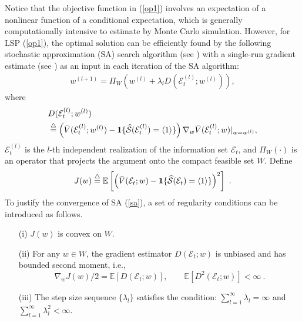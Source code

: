 \documentclass[journal]{IEEEtran}
\newcommand{\ed}{\stackrel{\triangle}{=}}
\begin{document}
      Notice that the objective function in (\ref{op1}) involves an expectation of a nonlinear function of a conditional expectation, which is generally computationally intensive to estimate by Monte Carlo simulation. However, for LSP (\ref{op1}), the optimal solution can be efficiently found by the following stochastic approximation (SA) search algorithm (see \cite{yin2003stochastic}) with a single-run gradient estimate (see \cite{fu2015gradient}) as an input in each iteration of the SA algorithm: 
     \begin{align}\label{sa}w^{(l+1)}=\Pi_{W}\left( w^{(l)}+\lambda_l D(\mathcal{E}_t^{(l)};w^{(l)})\right) ,\end{align}
       where 
       \begin{align*}
       &D(\mathcal{E}_t^{(l)};w^{(l)})\\
       &\ed\left(\bar{V}(\mathcal{E}_t^{(l)};w^{(l)})-{\bf1}\{ \widehat{\mathcal{S}}(\mathcal{E}_t^{(l)})=\langle 1 \rangle \}\right)\nabla_w \bar{V}(\mathcal{E}_t^{(l)};w)|_{w=w^{(l)}},  \end{align*}
      $\mathcal{E}_t^{(l)}$ is the $l$-th independent realization of the information set $\mathcal{E}_t$, and $\Pi_{W}(\cdot)$ is an operator that projects the argument onto the compact feasible set $W$. Define 
       $$J(w)\ed\mathbb{E}\left[\left(\bar{V}(\mathcal{E}_t;w)-{\bf1}\{ \widehat{\mathcal{S}}(\mathcal{E}_t)=\langle 1 \rangle \}\right)^2\right]~.$$
       To justify the convergence of SA (\ref{sa}), a set of regularity conditions can be introduced as follows.
       \begin{itemize}
       \item[(i)] $J(w)$ is convex on $W$.
       \item[(ii)] For any $w\in W$, the gradient estimator $ D(\mathcal{E}_t;w)$ is unbiased and has bounded second moment, i.e., $$\nabla_w J(w)/2=\mathbb{E}\left[ D(\mathcal{E}_t;w) \right],\qquad  \mathbb{E}\left[ D^2(\mathcal{E}_t;w)\right]<\infty~.$$
       \item [(iii)] The step size sequence $\{\lambda_l\}$ satisfies the condition: $\sum_{l=1}^{\infty} \lambda_l=\infty$ and $\sum_{l=1}^{\infty} \lambda_l^2<\infty$.
       \end{itemize}
  
\end{document}
